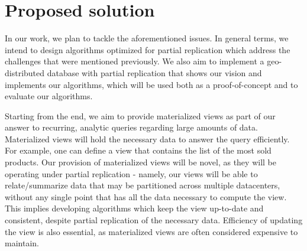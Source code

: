 %

\section{Proposed solution}


In our work, we plan to tackle the aforementioned issues.
In general terms, we intend to design algorithms optimized for partial replication which address the challenges that were mentioned previously.
We also aim to implement a geo-distributed database with partial replication that shows our vision and implements our algorithms, which will be used both as a proof-of-concept and to evaluate our algorithms.

Starting from the end, we aim to provide materialized views as part of our answer to recurring, analytic queries regarding large amounts of data.
Materialized views will hold the necessary data to answer the query efficiently.
For example, one can define a view that contains the list of the most sold products.
Our provision of materialized views will be novel, as they will be operating under partial replication - namely, our views will be able to relate/summarize data that may be partitioned across multiple datacenters, without any single point that has all the data necessary to compute the view.
This implies developing algorithms which keep the view up-to-date and consistent, despite partial replication of the necessary data.
Efficiency of updating the view is also essential, as materialized views are often considered expensive to maintain.

